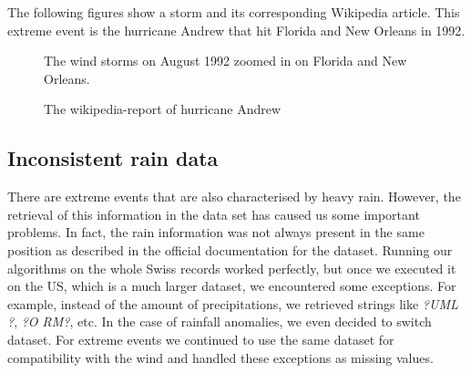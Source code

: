 The following figures show a storm and its corresponding Wikipedia article. This extreme event is the hurricane Andrew that hit Florida and New Orleans in 1992.
\begin{figure}[ht]
\centering
{}
\caption{The wind storms on August 1992 zoomed in on Florida and New Orleans.}
\label{fig:rainfall1}
\end{figure}
\begin{figure}[ht]
\centering
{}
\caption{The wikipedia-report of hurricane Andrew}
\label{fig:rainfall2}
\end{figure}


\subsection{Inconsistent rain data}
There are extreme events that are also characterised by heavy rain. However, the retrieval of this information in the data set has caused us some important problems. In fact, the rain information was not always present in the same position as described in the official documentation for the dataset. Running our algorithms on the whole Swiss records worked perfectly, but once we executed it on the US, which is a much larger dataset, we encountered some exceptions. For example, instead of the amount of precipitations, we retrieved strings like \textit{?UML ?}, \textit{?O RM?}, etc. In the case of rainfall anomalies,  we even decided to switch dataset. For extreme events we continued to use the same dataset for compatibility with the wind and handled these exceptions as missing values.

